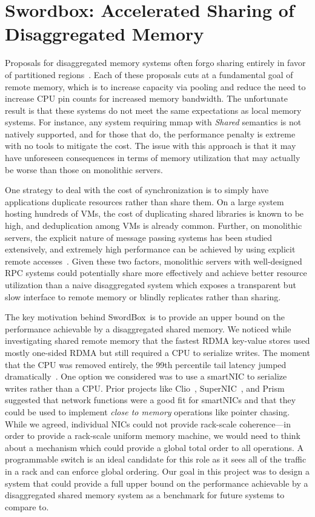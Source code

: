 \documentclass[12pt]{ucsddissertation}
\newcommand{\sword}{SwordBox}
\begin{document}
\chapter{Swordbox: Accelerated Sharing of Disaggregated Memory}
\label{chap:swordbox}


Proposals for disaggregated memory systems often forgo sharing entirely in favor of partitioned
regions~\cite{infiniswap,fastswap,leap,legoos,blade}. Each of these proposals cuts at a fundamental
goal of remote memory, which is to increase capacity via pooling and reduce the need to increase CPU
pin counts for increased memory bandwidth. The unfortunate result is that these systems do not meet
the same expectations as local memory systems. For instance, any system requiring mmap with
\textit{Shared} semantics is not natively supported, and for those that do, the performance penalty
is extreme with no tools to mitigate the cost. The issue with this approach is that it may have
unforeseen consequences in terms of memory utilization that may actually be worse than those on
monolithic servers. 

One strategy to deal with the cost of synchronization is to simply have applications duplicate
resources rather than share them. On a large system hosting hundreds of VMs, the cost of duplicating
shared libraries is known to be high, and deduplication among VMs is already common. Further, on
monolithic servers, the explicit nature of message passing systems has been studied extensively, and
extremely high performance can be achieved by using explicit remote accesses~\cite{herd, erpc}.
Given these two factors, monolithic servers with well-designed RPC systems could potentially share
more effectively and achieve better resource utilization than a naive disaggregated system which
exposes a transparent but slow interface to remote memory or blindly replicates rather than sharing.

The key motivation behind \sword\ is to provide an upper bound on the performance achievable by a
disaggregated shared memory. We noticed while investigating shared remote memory that the fastest
RDMA key-value stores used mostly one-sided RDMA but still required a CPU to serialize writes. The
moment that the CPU was removed entirely, the 99th percentile tail latency jumped
dramatically~\cite{clover}. One option we considered was to use a smartNIC to serialize writes
rather than a CPU. Prior projects like Clio~\cite{clio}, SuperNIC~\cite{supernic}, and
Prism~\cite{prism} suggested that network functions were a good fit for smartNICs and that they
could be used to implement \textit{close to memory} operations like pointer chasing. While we
agreed, individual NICs could not provide rack-scale coherence—in order to provide a rack-scale
uniform memory machine, we would need to think about a mechanism which could provide a global total
order to all operations. A programmable switch is an ideal candidate for this role as it sees all of
the traffic in a rack and can enforce global ordering. Our goal in this project was to design a
system that could provide a full upper bound on the performance achievable by a disaggregated shared
memory system as a benchmark for future systems to compare to.
\end{document}
